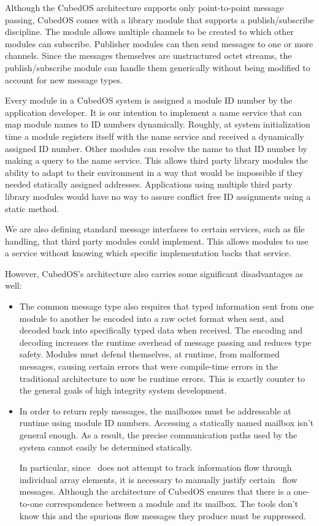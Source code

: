 Although the CubedOS architecture supports only point-to-point message passing, CubedOS comes
with a library module that supports a publish/subscribe discipline. The module allows multiple
channels to be created to which other modules can subscribe. Publisher modules can then send
messages to one or more channels. Since the messages themselves are unstructured octet streams,
the publish/subscribe module can handle them generically without being modified to account for
new message types.

Every module in a CubedOS system is assigned a module ID number by the application developer. It is our intention to implement a name service that can map module names to
ID numbers dynamically. Roughly, at system initialization time a module registers itself with
the name service and received a dynamically assigned ID number. Other modules can resolve the
name to that ID number by making a query to the name service. This allows third party library
modules the ability to adapt to their environment in a way that would be impossible if they
needed statically assigned addresses. Applications using multiple third party library modules
would have no way to assure conflict free ID assignments using a static method.

We are also defining standard message interfaces to certain services, such as file handling,
that third party modules could implement. This allows modules to use a service without knowing
which specific implementation backs that service.

However, CubedOS's architecture also carries some significant disadvantages as well:

\begin{itemize}

\item
  The common message type also requires that typed information sent from one module to another
  be encoded into a raw octet format when sent, and decoded back into specifically typed data
  when received. The encoding and decoding increases the runtime overhead of message passing and
  reduces type safety. Modules must defend themselves, at runtime, from malformed messages, causing certain errors that were compile-time errors in the
  traditional architecture to now be runtime errors. This is exactly counter to the general
  goals of high integrity system development.

\item In order to return reply messages, the mailboxes must be addressable at runtime using
  module ID numbers. Accessing a statically named mailbox isn't general enough. As a result, the
  precise communication paths used by the system cannot easily be determined statically.

  In particular, since \SPARK\ does not attempt to track information flow through individual
  array elements, it is necessary to manually justify certain \SPARK\ flow messages.  Although the architecture of CubedOS ensures that there
  is a one-to-one correspondence between a module and its mailbox. The tools don't know this and
  the spurious flow messages they produce must be suppressed.
\end{itemize}


